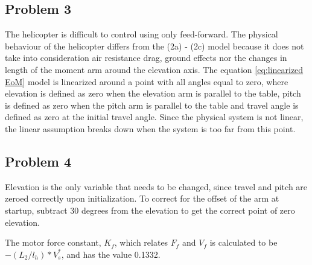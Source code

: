 \subsection{Problem 3}
The helicopter is difficult to control using only feed-forward. The
physical behaviour of the helicopter differs from the (2a) - (2c)
\cite[p.13]{assignment} model because it does not take into
consideration air resistance drag, ground effects nor the changes in
length of the moment arm around the elevation axis. The equation
\eqref{eq:linearized EoM} model is linearized around a point with all
angles equal to zero, where elevation is defined as zero when the
elevation arm is parallel to the table, pitch is defined as zero when
the pitch arm is parallel to the table and travel angle is defined as
zero at the initial travel angle. Since the physical system is not
linear, the linear assumption breaks down when the system is too far
from this point.

\subsection{Problem 4}
Elevation is the only variable that needs to be changed, since travel
and pitch are zeroed correctly upon initialization. To correct for the
offset of the arm at startup, subtract 30 degrees from the elevation
to get the correct point of zero elevation.


The motor force constant, $K_f$, which relates $F_f$ and $V_f$ is
calculated to be $-(L_2/l_h)*V^*_s$, and has the value 0.1332.


